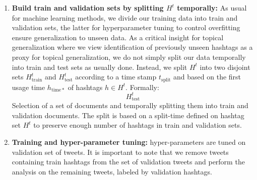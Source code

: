 \begin{enumerate}
\item {\bf Build train and validation sets by splitting $H^t$ temporally:}
As usual for machine learning methods, we divide our training data into
train and validation sets, the latter for hyperparameter tuning to control
overfitting ensure generalization to unseen data.  
As a critical insight for topical generalization where we view identification
of previously unseen hashtags as a proxy for topical generalization, we do not simply
split our data temporally into train and test sets as usually done.  Instead,
we split $H^t$ into two disjoint sets $H^t_\mathrm{train}$ and $H^t_\mathrm{test}$ 
according to a time stamp $t_\mathrm{split}$ and based on the first usage time
$h_\mathrm{time*}$ of hashtags $h \in H^t$.  Formally:
\begin{equation*}
H^t_\mathrm{test}
\end{equation*}
Selection of a set of documents and temporally splitting them into
train and validation documents. The split is based on a split-time
defined on hashtag set $H^{t}$ to preserve enough number of hashtags
in train and validation sets.
\item {\bf Training and hyper-parameter tuning:}
hyper-parameters are tuned on validation set of tweets. It is
important to note that we remove tweets containing train hashtags from
the set of validation tweets and perform the analysis on the remaining
tweets, labeled by validation hashtags.

\end{enumerate}
